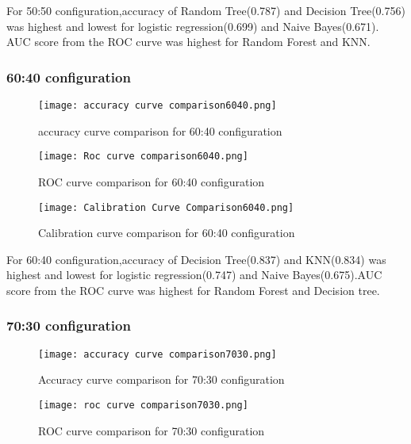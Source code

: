 \documentclass{article}
\begin{document}
For 50:50 configuration,accuracy of Random Tree(0.787) and Decision Tree(0.756) was highest and lowest for logistic regression(0.699) and Naive Bayes(0.671). AUC score from the ROC curve was highest for Random Forest and KNN.

\subsubsection{60:40 configuration}


\begin{figure}[H]
\centering
\texttt{[image: accuracy curve comparison6040.png]}
\caption {accuracy curve comparison for 60:40 configuration}
\label{fig-name}
\end{figure}

\begin{figure}[H]
\centering
\texttt{[image: Roc curve comparison6040.png]}
\caption {ROC curve comparison for 60:40 configuration}
\label{fig-name}
\end{figure}


\begin{figure}[H]
\centering
\texttt{[image: Calibration Curve Comparison6040.png]}
\caption {Calibration curve comparison for 60:40 configuration}
\label{fig-name}
\end{figure}

For 60:40 configuration,accuracy of Decision Tree(0.837) and KNN(0.834) was highest and lowest for logistic regression(0.747) and Naive Bayes(0.675).AUC score from the ROC curve was highest for Random Forest and Decision tree.

\subsubsection{70:30 configuration}
\begin{figure}[H]
\centering
\texttt{[image: accuracy curve comparison7030.png]}
\caption {Accuracy curve comparison for 70:30 configuration}
\label{fig-name}
\end{figure}


\begin{figure}[H]
\centering
\texttt{[image: roc curve comparison7030.png]}
\caption {ROC curve comparison for 70:30 configuration}
\label{fig-name}
\end{figure}
\end{document}
